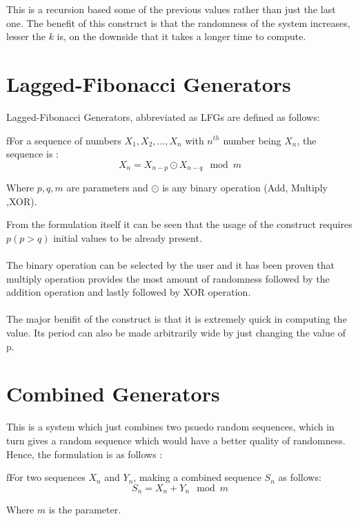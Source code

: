 \noindent This is a recursion based some of the previous 
values rather than just the last one. The benefit of this 
construct is that the randomness of the system increases, 
lesser the $k$ is, on the downside that it takes a longer 
time to compute.

\section{Lagged-Fibonacci Generators}
Lagged-Fibonacci Generators, abbreviated as LFGs are 
defined as follows:

\begin{definition}
    fFor a sequence of numbers $X_1,X_2, \dots, X_n $ with 
    $n^{th}$ number being $X_n$, 
    the sequence is :\\
    \begin{equation*}
        X_n = X_{n-p} \odot X_{n-q} \mod m
    \end{equation*}

    \noindent Where $p,q,m$ are parameters and $\odot$ is 
    any binary operation (Add, Multiply ,XOR).
\end{definition}

\noindent From the formulation itself it can be seen that 
the usage of the construct requires $p (p > q)$ initial values 
to be already present.
\\\\
The binary operation can be selected by the user and it has 
been proven that multiply operation provides the most amount 
of randomness followed by the addition operation and lastly 
followed by XOR operation.
\\\\
The major benifit of the construct is that it is extremely 
quick in computing the value. Its period can also be made 
arbitrarily wide by just changing the value of p.

\section{Combined Generators}
This is a system which just combines two psuedo 
random sequences, which in turn gives a random sequence 
which would have a better quality of randomness. 
Hence, the formulation is as follows :

\begin{definition}
    fFor two sequences $X_n$ and $Y_n$, making a combined 
    sequence $S_n$ as follows:\\
    \begin{equation*}
        S_n = X_{n} + Y_{n} \mod m
    \end{equation*}

    \noindent Where $m$ is the parameter.
\end{definition}

